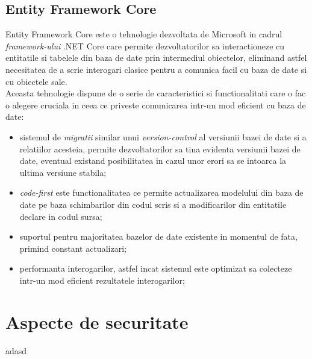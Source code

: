  \subsection*{Entity Framework Core}
Entity Framework Core este o tehnologie dezvoltata de Microsoft in cadrul \textit{framework-ului} .NET Core care permite dezvoltatorilor sa interactioneze cu entitatile si tabelele din baza de date prin intermediul obiectelor, eliminand astfel necesitatea de a scrie interogari clasice pentru a comunica facil cu baza de date si cu obiectele sale.\\
Aceasta tehnologie dispune de o serie de caracteristici si functionalitati care o fac o alegere cruciala in ceea ce priveste comunicarea intr-un mod eficient cu baza de date:
\begin{itemize}
	
	\item sistemul de \textit{migratii} similar unui \textit{version-control} al versiunii bazei de date si a relatiilor acesteia, permite dezvoltatorilor sa tina evidenta versiunii bazei de date, eventual existand posibilitatea in cazul unor erori sa se intoarca la ultima versiune stabila;
	
	\item \textit{code-first} este functionalitatea ce permite actualizarea modelului din baza de date pe baza schimbarilor din codul scris si a modificarilor din entitatile declare in codul sursa;
	
	\item suportul pentru majoritatea bazelor de date existente in momentul de fata, primind constant actualizari;
	
	\item performanta interogarilor, astfel incat sistemul este optimizat sa colecteze intr-un mod eficient rezultatele interogarilor;
	 
\end{itemize}



\section{Aspecte de securitate}

adasd